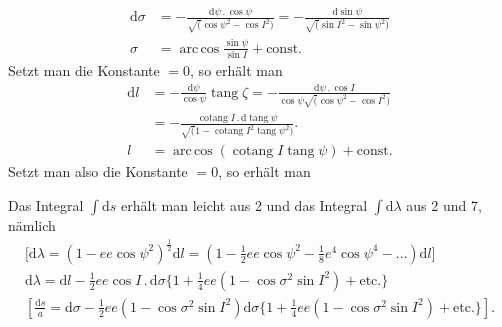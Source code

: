 \par\clearpage
\noindent\makebox[12mm][l]{}\par\medskip

\[
\begin{aligned}
\mathrm d\sigma
&=-\frac{\mathrm d\psi\,.\,\cos\psi}{\surd(\cos\psi^2-\cos I^2)}
=-\frac{\mathrm d\sin\psi}{\surd(\sin I^2-\sin\psi^2)}\\
\sigma&=\operatorname{arc\,cos}\frac{\sin\psi}{\sin I}+\text{const.}
\end{aligned}
\]
\noindent Setzt man die Konstante \(=0\), so erhält man
\[
\begin{aligned}
\mathrm dl&=-\frac{\mathrm d\psi}{\cos\psi}\operatorname{tang}\zeta
=-\frac{\mathrm d\psi\,.\,\cos I}{\cos\psi\surd(\cos\psi^2-\cos I^2)}\\
&=-\frac{\operatorname{cotang}I\,.\,\mathrm d\operatorname{tang}\psi}
{\surd(1-\operatorname{cotang}I^2\operatorname{tang}\psi^2)}.\\
l&=\operatorname{arc\,cos}(\operatorname{cotang}I\operatorname{tang}\psi)+\text{const.}
\end{aligned}
\]
\noindent Setzt man also die Konstante \(=0\), so erhält man
\noindent [folglich]

\noindent Das Integral \(\int\mathrm ds\) erhält man leicht aus 2 und das Integral \(\int\mathrm d\lambda\)
aus 2 und 7, nämlich
\[
\begin{gathered}
{[}\mathrm d\lambda=(1-ee\cos\psi^2)^{\frac12}\mathrm dl
=(1-\tfrac12 ee\cos\psi^2-\tfrac18e^4\cos\psi^4-\ldots)\mathrm dl]\\
\mathrm d\lambda=\mathrm dl-\tfrac12ee\cos I\,.\,\mathrm d\sigma
\{1+\tfrac14 ee(1-\cos\sigma^2\sin I^2)+\text{etc.}\}\\
\left[\frac{\mathrm ds}a=\mathrm d\sigma-\tfrac12ee(1-\cos\sigma^2\sin I^2)\mathrm d\sigma
\{1+\tfrac14 ee(1-\cos\sigma^2\sin I^2)+\text{etc.}\}\right].
\end{gathered}
\]

